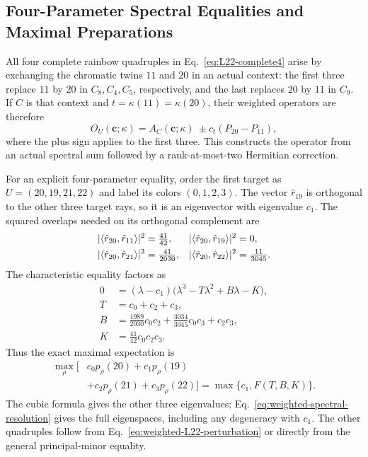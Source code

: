\documentclass[aps,pra,reprint,superscriptaddress,longbibliography,nofootinbib,floatfix,10pt]{revtex4-2}
\theoremstyle{definition}\newtheorem{definition}[theorem]{Definition}
\theoremstyle{remark}\newtheorem{remark}[theorem]{Remark}
\begin{document}
\subsection{Four-Parameter Spectral Equalities and Maximal Preparations}\label{sec:weighted-four-dimensional}

All four complete rainbow quadruples in Eq.~\eqref{eq:L22-complete4} arise by exchanging the chromatic twins $11$ and $20$ in an actual context: the first three replace $11$ by $20$ in $C_8,C_4,C_5$, respectively, and the last replaces $20$ by $11$ in $C_9$. If $C$ is that context and $t=\kappa(11)=\kappa(20)$, their weighted operators are therefore
\begin{equation}\label{eq:weighted-L22-perturbation}
O_U(\mathbf c;\kappa)=A_C(\mathbf c;\kappa)
\ \pm c_t(P_{20}-P_{11}),
\end{equation}
where the plus sign applies to the first three. This constructs the operator from an actual spectral sum followed by a rank-at-most-two Hermitian correction.

For an explicit four-parameter equality, order the first target as $U=(20,19,21,22)$ and label its colors $(0,1,2,3)$. The vector $\hat r_{19}$ is orthogonal to the other three target rays, so it is an eigenvector with eigenvalue $c_1$. The squared overlaps needed on its orthogonal complement are
\begin{equation}\label{eq:weighted-L22-overlaps}
\begin{aligned}
|\langle \hat r_{20},\hat r_{11}\rangle|^2&=\tfrac{41}{42},&
|\langle \hat r_{20},\hat r_{19}\rangle|^2&=0,\\
|\langle \hat r_{20},\hat r_{21}\rangle|^2&=\tfrac{41}{2030},&
|\langle \hat r_{20},\hat r_{22}\rangle|^2&=\tfrac{11}{3045}.
\end{aligned}
\end{equation}
The characteristic equality factors as
\begin{equation}\label{eq:weighted-L22-polynomial}
\begin{aligned}
0&=(\lambda-c_1)\bigl(\lambda^3-T\lambda^2+B\lambda-K\bigr),\\
T&=c_0+c_2+c_3,\\
B&=\tfrac{1989}{2030}c_0c_2+\tfrac{3034}{3045}c_0c_3+c_2c_3,\\
K&=\tfrac{41}{42}c_0c_2c_3.
\end{aligned}
\end{equation}
Thus the exact maximal expectation is
\begin{equation}\label{eq:weighted-L22-max}
\boxed{\begin{aligned}
\max_\rho\bigl[&c_0p_\rho(20)+c_1p_\rho(19)\\
&+c_2p_\rho(21)+c_3p_\rho(22)\bigr]
=\max\{c_1,F(T,B,K)\}.
\end{aligned}}
\end{equation}
The cubic formula gives the other three eigenvalues; Eq.~\eqref{eq:weighted-spectral-resolution} gives the full eigenspaces, including any degeneracy with $c_1$. The other quadruples follow from Eq.~\eqref{eq:weighted-L22-perturbation} or directly from the general principal-minor equality.
\end{document}
